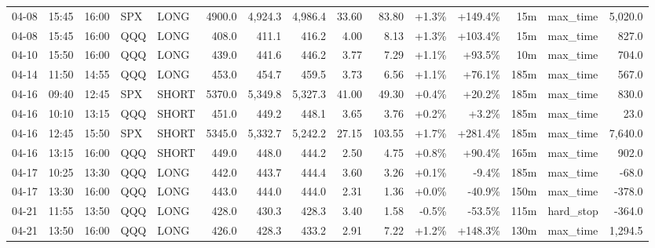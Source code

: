\documentclass[11pt,a4paper,twoside]{article}
\begin{document}
\begin{landscape}
\begin{center}
\begin{longtable}{>{\color{txtmain}}l l l l l r r r r r r r r >{\color{txtmain}}l r}
04-08 & 15:45 & 16:00 & SPX & LONG & 4900.0 & 4,924.3 & 4,986.4 & 33.60 & 83.80 & \textcolor{wingreen}{+1.3\%} & \textcolor{wingreen}{+149.4\%} & 15m & max\_time & \textcolor{wingreen}{5,020.0} \\
04-08 & 15:45 & 16:00 & QQQ & LONG & 408.0 & 411.1 & 416.2 & 4.00 & 8.13 & \textcolor{wingreen}{+1.3\%} & \textcolor{wingreen}{+103.4\%} & 15m & max\_time & \textcolor{wingreen}{827.0} \\
04-10 & 15:50 & 16:00 & QQQ & LONG & 439.0 & 441.6 & 446.2 & 3.77 & 7.29 & \textcolor{wingreen}{+1.1\%} & \textcolor{wingreen}{+93.5\%} & 10m & max\_time & \textcolor{wingreen}{704.0} \\
04-14 & 11:50 & 14:55 & QQQ & LONG & 453.0 & 454.7 & 459.5 & 3.73 & 6.56 & \textcolor{wingreen}{+1.1\%} & \textcolor{wingreen}{+76.1\%} & 185m & max\_time & \textcolor{wingreen}{567.0} \\
04-16 & 09:40 & 12:45 & SPX & SHORT & 5370.0 & 5,349.8 & 5,327.3 & 41.00 & 49.30 & \textcolor{wingreen}{+0.4\%} & \textcolor{wingreen}{+20.2\%} & 185m & max\_time & \textcolor{wingreen}{830.0} \\
04-16 & 10:10 & 13:15 & QQQ & SHORT & 451.0 & 449.2 & 448.1 & 3.65 & 3.76 & \textcolor{wingreen}{+0.2\%} & \textcolor{wingreen}{+3.2\%} & 185m & max\_time & \textcolor{wingreen}{23.0} \\
04-16 & 12:45 & 15:50 & SPX & SHORT & 5345.0 & 5,332.7 & 5,242.2 & 27.15 & 103.55 & \textcolor{wingreen}{+1.7\%} & \textcolor{wingreen}{+281.4\%} & 185m & max\_time & \textcolor{wingreen}{7,640.0} \\
04-16 & 13:15 & 16:00 & QQQ & SHORT & 449.0 & 448.0 & 444.2 & 2.50 & 4.75 & \textcolor{wingreen}{+0.8\%} & \textcolor{wingreen}{+90.4\%} & 165m & max\_time & \textcolor{wingreen}{902.0} \\
04-17 & 10:25 & 13:30 & QQQ & LONG & 442.0 & 443.7 & 444.4 & 3.60 & 3.26 & \textcolor{wingreen}{+0.1\%} & \textcolor{lossred}{-9.4\%} & 185m & max\_time & \textcolor{lossred}{-68.0} \\
04-17 & 13:30 & 16:00 & QQQ & LONG & 443.0 & 444.0 & 444.0 & 2.31 & 1.36 & \textcolor{wingreen}{+0.0\%} & \textcolor{lossred}{-40.9\%} & 150m & max\_time & \textcolor{lossred}{-378.0} \\
04-21 & 11:55 & 13:50 & QQQ & LONG & 428.0 & 430.3 & 428.3 & 3.40 & 1.58 & \textcolor{lossred}{-0.5\%} & \textcolor{lossred}{-53.5\%} & 115m & hard\_stop & \textcolor{lossred}{-364.0} \\
04-21 & 13:50 & 16:00 & QQQ & LONG & 426.0 & 428.3 & 433.2 & 2.91 & 7.22 & \textcolor{wingreen}{+1.2\%} & \textcolor{wingreen}{+148.3\%} & 130m & max\_time & \textcolor{wingreen}{1,294.5} \\

\end{longtable}
\end{center}
\end{landscape}
\end{document}
